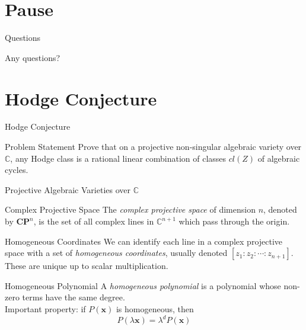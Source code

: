 \documentclass[handout]{beamer}
\newcommand{\Complex}{\mathbb{C}}
\newcommand{\CP}{\mathbf{CP}}
\renewcommand{\vec}[1]{\mathbf{#1}}
\begin{document}
  \section{Pause}
  \begin{frame}{Questions}
      \begin{block}{}
          Any questions?
      \end{block}
  \end{frame}


  \section{Hodge Conjecture}
  \begin{frame}{Hodge Conjecture}
      \begin{block}{Problem Statement}
          Prove that on a projective non-singular algebraic variety over
          $\Complex$, any Hodge class is a rational linear combination of
          classes $cl(Z)$ of algebraic cycles.
      \end{block}
  \end{frame}
  \begin{frame}{Projective Algebraic Varieties over $\Complex$}
      \pause
      \begin{block}{Complex Projective Space}
          The \textit{complex projective space} of dimension $n$, denoted by
          $\CP^n$, is the set of all \alert{complex} lines in $\Complex^{n+1}$
          which pass through the origin.
      \end{block}
      \pause
      \begin{block}{Homogeneous Coordinates}
          We can identify each line in a complex projective space with a set of
          \textit{homogeneous coordinates}, usually denoted $[z_1 : z_2 :
          \cdots : z_{n+1}]$. These are unique up to scalar multiplication.
      \end{block}
      \pause
      \begin{block}{Homogeneous Polynomial}
          A \textit{homogeneous polynomial} is a polynomial whose non-zero
          terms have the same degree.
          \pause\\
          Important property: if $P(\vec{x})$ is homogeneous, then
          $$P(\lambda\vec{x}) = \lambda^d P(\vec{x})$$
      \end{block}
  \end{frame}
\end{document}
